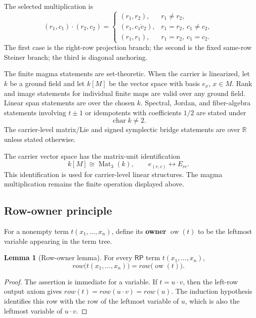 \documentclass[11pt]{article}
\theoremstyle{definition}
\newtheorem{lemma}[theorem]{Lemma}
\newcommand{\RP}{\mathsf{RP}}
\begin{document}
The selected multiplication is
\[
(r_1,c_1)\cdot(r_2,c_2)=
\begin{cases}
(r_1,r_2), & r_1\ne r_2,\\[2mm]
(r_1,\overline{c_1c_2}), & r_1=r_2,\ c_1\ne c_2,\\[2mm]
(r_1,r_1), & r_1=r_2,\ c_1=c_2.
\end{cases}
\]
The first case is the right-row projection branch; the second is the fixed
same-row Steiner branch; the third is diagonal anchoring.

The finite magma statements are set-theoretic.  When the carrier is
linearized, let \(k\) be a ground field and let \(k[M]\) be the vector
space with basis \(e_x\), \(x\in M\).  Rank and image statements for
individual finite maps are valid over any ground field.  Linear span
statements are over the chosen \(k\).  Spectral, Jordan, and
fiber-algebra statements involving \(t\pm1\) or idempotents with
coefficients \(1/2\) are stated under
\[
\operatorname{char}k\ne2.
\]
The carrier-level matrix/Lie and signed symplectic bridge statements are
over \(\mathbb R\) unless stated otherwise.

The carrier vector space has the matrix-unit identification
\[
k[M]\cong\operatorname{Mat}_3(k),
\qquad e_{(r,c)}\leftrightarrow E_{rc}.
\]
This identification is used for carrier-level linear structures.  The
magma multiplication remains the finite operation displayed above.

\subsection{Row-owner principle}\label{row-owner-principle}

For a nonempty term \(t(x_1,\ldots,x_n)\), define its \textbf{owner}
\(\operatorname{ow}(t)\) to be the leftmost variable appearing in the term
tree.

\begin{lemma}[Row-owner lemma]
\label{lem:13.1}
For every \(\RP\) term \(t(x_1,\ldots,x_n)\),
\[
row\bigl(t(x_1,\ldots,x_n)\bigr)
=
row\bigl(\operatorname{ow}(t)\bigr).
\]
\end{lemma}

\begin{proof}
The assertion is immediate for a variable.  If \(t=u\cdot v\), then the
left-row output axiom gives \(row(t)=row(u\cdot v)=row(u)\).  The induction
hypothesis identifies this row with the row of the leftmost variable of
\(u\), which is also the leftmost variable of \(u\cdot v\).
\end{proof}
\end{document}
